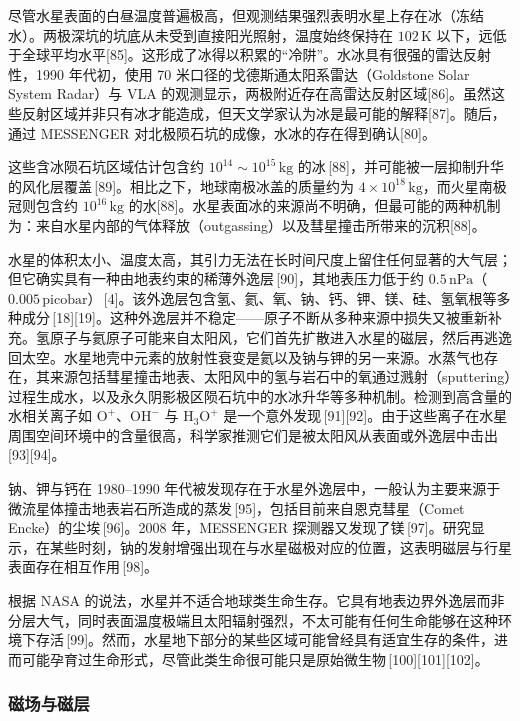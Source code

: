 尽管水星表面的白昼温度普遍极高，但观测结果强烈表明水星上存在冰（冻结水）。两极深坑的坑底从未受到直接阳光照射，温度始终保持在 \(102\,\mathrm{K}\) 以下，远低于全球平均水平[85]。这形成了冰得以积累的“冷阱”。水冰具有很强的雷达反射性，1990 年代初，使用 70 米口径的戈德斯通太阳系雷达（Goldstone Solar System Radar）与 VLA 的观测显示，两极附近存在高雷达反射区域[86]。虽然这些反射区域并非只有冰才能造成，但天文学家认为冰是最可能的解释[87]。随后，通过 MESSENGER 对北极陨石坑的成像，水冰的存在得到确认[80]。

这些含冰陨石坑区域估计包含约 \(10^{14}\sim10^{15}\,\mathrm{kg}\) 的冰\,[88]，并可能被一层抑制升华的风化层覆盖\,[89]。相比之下，地球南极冰盖的质量约为 \(4\times10^{18}\,\mathrm{kg}\)，而火星南极冠则包含约 \(10^{16}\,\mathrm{kg}\) 的水[88]。水星表面冰的来源尚不明确，但最可能的两种机制为：来自水星内部的气体释放（outgassing）以及彗星撞击所带来的沉积[88]。

水星的体积太小、温度太高，其引力无法在长时间尺度上留住任何显著的大气层；但它确实具有一种由地表约束的稀薄外逸层\,[90]，其地表压力低于约 \(0.5\,\mathrm{nPa}\)（\(0.005\,\mathrm{picobar}\)）\,[4]。该外逸层包含氢、氦、氧、钠、钙、钾、镁、硅、氢氧根等多种成分\,[18][19]。这种外逸层并不稳定——原子不断从多种来源中损失又被重新补充。氢原子与氦原子可能来自太阳风，它们首先扩散进入水星的磁层，然后再逃逸回太空。水星地壳中元素的放射性衰变是氦以及钠与钾的另一来源。水蒸气也存在，其来源包括彗星撞击地表、太阳风中的氢与岩石中的氧通过溅射（sputtering）过程生成水，以及永久阴影极区陨石坑中的水冰升华等多种机制。检测到高含量的水相关离子如 \(\mathrm{O^{+}}\)、\(\mathrm{OH^{-}}\) 与 \(\mathrm{H_{3}O^{+}}\) 是一个意外发现\,[91][92]。由于这些离子在水星周围空间环境中的含量很高，科学家推测它们是被太阳风从表面或外逸层中击出\,[93][94]。

钠、钾与钙在 1980–1990 年代被发现存在于水星外逸层中，一般认为主要来源于微流星体撞击地表岩石所造成的蒸发\,[95]，包括目前来自恩克彗星（Comet Encke）的尘埃\,[96]。2008 年，MESSENGER 探测器又发现了镁\,[97]。研究显示，在某些时刻，钠的发射增强出现在与水星磁极对应的位置，这表明磁层与行星表面存在相互作用\,[98]。

根据 NASA 的说法，水星并不适合地球类生命生存。它具有地表边界外逸层而非分层大气，同时表面温度极端且太阳辐射强烈，不太可能有任何生命能够在这种环境下存活\,[99]。然而，水星地下部分的某些区域可能曾经具有适宜生存的条件，进而可能孕育过生命形式，尽管此类生命很可能只是原始微生物\,[100][101][102]。
\subsubsection{磁场与磁层}






